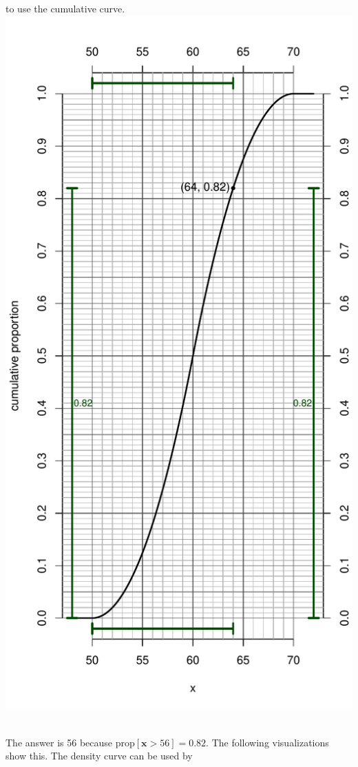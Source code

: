 \begin{solution}
\begin{answerlist}
to use the cumulative curve. \includegraphics{unnamed-chunk-16-1.pdf} ~
  \item The answer is 56 because \(\text{prop}[\mathbf{x}>56]=0.82\). The
following visualizations show this. The density curve can be used by

\end{answerlist}
\end{solution}
